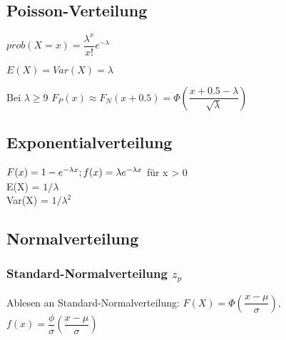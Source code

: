 \subsection*{Poisson-Verteilung}

$prob(X=x) = \dfrac{\lambda^x}{x!}e^{-\lambda}$

$E(X) = Var(X) = \lambda$

\Naeherung Bei $\lambda \geq 9$ $F_P(x) \approx F_N(x+0.5)=\Phi \left( \dfrac{x+0.5-\lambda}{\sqrt{\lambda}}\right)$


\subsection*{Exponentialverteilung}
$F(x) = 1 - e^{-\lambda x};  \\ f(x) = \lambda e^{-\lambda x}$ für x > 0 \\
E(X) = $1/\lambda$ \\
Var(X) = $1/\lambda^2$


\subsection*{Normalverteilung}

\subsubsection*{Standard-Normalverteilung $z_p$}


Ablesen an Standard-Normalverteilung: $F(X) = \Phi \left(\dfrac{x-\mu}{\sigma} \right)$, $f(x) = \dfrac{\phi}{\sigma} \left(\dfrac{x-\mu}{\sigma} \right)$

